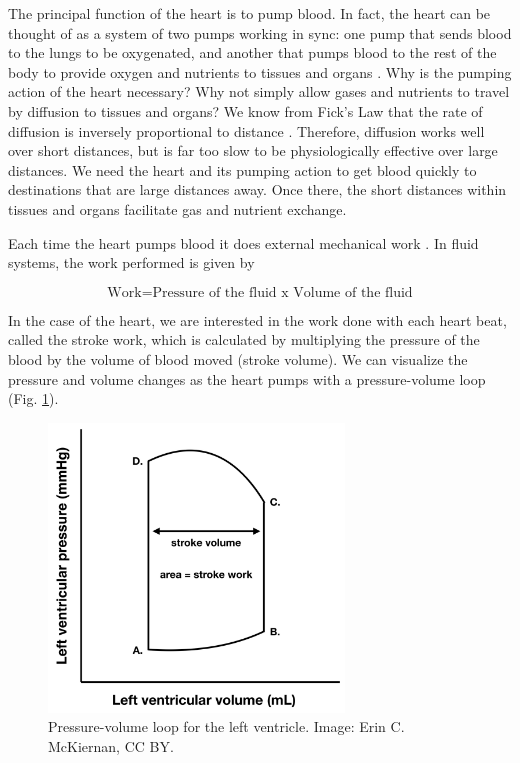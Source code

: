 \documentclass[12pt]{article}
\begin{document}
The principal function of the heart is to pump blood. In fact, the heart can be thought of as a system of two pumps working in sync: one pump that sends blood to the lungs to be oxygenated, and another that pumps blood to the rest of the body to provide oxygen and nutrients to tissues and organs \cite{khanHeart,mohrman2006cardiovascular}. Why is the pumping action of the heart necessary? Why not simply allow gases and nutrients to travel by diffusion to tissues and organs? We know from Fick's Law that the rate of diffusion is inversely proportional to distance \cite{khanHeart,sperelakis2012cell}. Therefore, diffusion works well over short distances, but is far too slow to be physiologically effective over large distances. We need the heart and its pumping action to get blood quickly to destinations that are large distances away. Once there, the short distances within tissues and organs facilitate gas and nutrient exchange.

Each time the heart pumps blood it does external mechanical work \cite{mohrman2006cardiovascular,khanWork}. In fluid systems, the work performed is given by

\begin{equation}
    \textrm{Work} = \textrm{Pressure of the fluid x Volume of the fluid}
\end{equation}

In the case of the heart, we are interested in the work done with each heart beat, called the stroke work, which is calculated by multiplying the pressure of the blood by the volume of blood moved (stroke volume). We can visualize the pressure and volume changes as the heart pumps with a pressure-volume loop \cite{khanPV} (Fig. \ref{fig:pvLoop}).

\begin{figure}[h!]
\centering
\includegraphics[width=0.7\textwidth]{figures/pvLoop.png}
\caption{Pressure-volume loop for the left ventricle. Image: Erin C. McKiernan, CC BY.}
\label{fig:pvLoop}
\end{figure}
\end{document}
